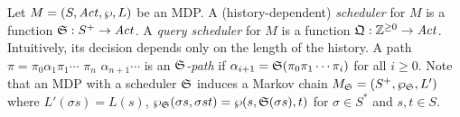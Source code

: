 Let $M = (S, \mathit{Act}, \wp, L)$ be an MDP. A (history-dependent)
\emph{scheduler} for $M$ is a function $\mathfrak{S} : S^+
\rightarrow \mathit{Act}$. A \emph{query scheduler} for $M$ is a function
$\mathfrak{Q} : \mathbb{Z}^{\geq 0} \rightarrow \mathit{Act}$. Intuitively, its decision depends only on the length of the history.
A path $\pi =
\pi_0 \alpha_1 \pi_1 \cdots$ $\pi_n$ $\alpha_{n+1} \cdots$ is an
\emph{$\mathfrak{S}$-path} if $\alpha_{i+1} = \mathfrak{S}(\pi_0
\pi_1 \cdots \pi_i)$ for all $i \geq 0$.
Note that an MDP with a
scheduler $\mathfrak{S}$ induces a Markov chain $M_{\mathfrak{S}} =
(S^+, \wp_{\mathfrak{S}}, L')$ where $L' (\sigma s) = L (s)$,
$\wp_{\mathfrak{S}} (\sigma s, \sigma s t) = \wp (s,
\mathfrak{S}(\sigma s), t)$ for $\sigma \in S^*$ and $s, t \in S$.

